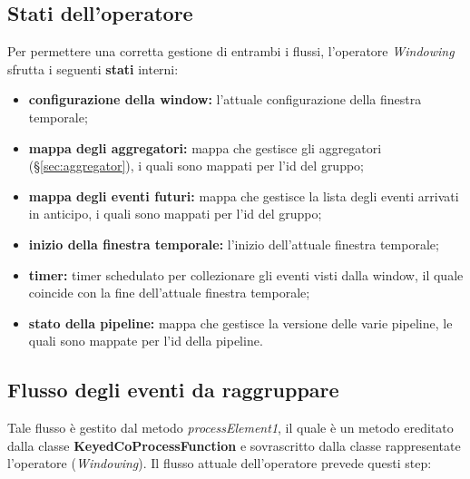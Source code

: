 \subsection{Stati dell'operatore}\label{sec:stati-windowing}
Per permettere una corretta gestione di entrambi i flussi, l'operatore \textit{Windowing} sfrutta i seguenti \textbf{stati} interni:
\begin{itemize}
		\item{\textbf{configurazione della window:} l'attuale configurazione della finestra temporale;}
		\item{\textbf{mappa degli aggregatori:} mappa che gestisce gli aggregatori (\S\ref{sec:aggregator}), i quali sono mappati per l'id del gruppo;}
		\item{\textbf{mappa degli eventi futuri:} mappa che gestisce la lista degli eventi arrivati in anticipo, i quali sono mappati per l'id del gruppo;}
		\item{\textbf{inizio della finestra temporale:} l'inizio dell'attuale finestra temporale;}
		\item{\textbf{timer:} timer schedulato per collezionare gli eventi visti dalla window, il quale coincide con la fine dell'attuale finestra temporale;}
		\item{\textbf{stato della \gls{pipeline}:} mappa che gestisce la versione delle varie \gls{pipeline}, le quali sono mappate per l'id della \gls{pipeline}.}
\end{itemize}


\subsection{Flusso degli eventi da raggruppare}\label{sec:pr1-windowing}
Tale flusso è gestito dal metodo \textit{processElement1}, il quale è un metodo ereditato dalla classe \textbf{KeyedCoProcessFunction} e sovrascritto dalla classe rappresentate l'operatore (\textit{Windowing}). Il flusso attuale dell'operatore prevede questi step:

